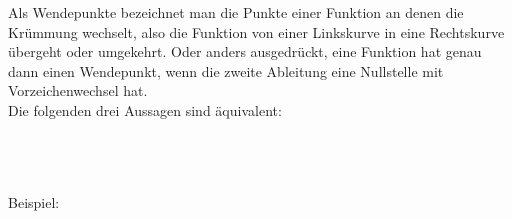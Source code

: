 Als Wendepunkte bezeichnet man die Punkte einer Funktion an denen die Krümmung wechselt, also die Funktion von einer Linkskurve in eine Rechtskurve übergeht oder umgekehrt. Oder anders ausgedrückt, eine Funktion hat genau dann einen Wendepunkt, wenn die zweite Ableitung eine Nullstelle mit Vorzeichenwechsel hat.\\
Die folgenden drei Aussagen sind äquivalent:\\ \\
\begin{minipage}{\textwidth}
\end{minipage}\\
\\Beispiel:\\
